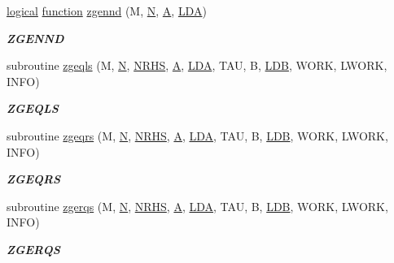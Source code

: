 \begin{DoxyCompactItemize}
\hyperlink{tnc_8c_aa7b64cdf39500931f7b333343791a104}{logical} \hyperlink{afunc_8m_a7b5e596df91eadea6c537c0825e894a7}{function} \hyperlink{group__complex16__lin_gadf56477aea9e1818a7c8d472f7fd1361}{zgennd} (M, \hyperlink{polmisc_8c_a0240ac851181b84ac374872dc5434ee4}{N}, \hyperlink{classA}{A}, \hyperlink{example__user_8c_ae946da542ce0db94dced19b2ecefd1aa}{L\+D\+A})
\begin{DoxyCompactList}\small\item\em {\bfseries Z\+G\+E\+N\+N\+D} \end{DoxyCompactList}\item 
subroutine \hyperlink{group__complex16__lin_ga0c294a42b3a456d8a3308f8618612ac8}{zgeqls} (M, \hyperlink{polmisc_8c_a0240ac851181b84ac374872dc5434ee4}{N}, \hyperlink{example__user_8c_aa0138da002ce2a90360df2f521eb3198}{N\+R\+H\+S}, \hyperlink{classA}{A}, \hyperlink{example__user_8c_ae946da542ce0db94dced19b2ecefd1aa}{L\+D\+A}, T\+A\+U, B, \hyperlink{example__user_8c_a50e90a7104df172b5a89a06c47fcca04}{L\+D\+B}, W\+O\+R\+K, L\+W\+O\+R\+K, I\+N\+F\+O)
\begin{DoxyCompactList}\small\item\em {\bfseries Z\+G\+E\+Q\+L\+S} \end{DoxyCompactList}\item 
subroutine \hyperlink{group__complex16__lin_gae16c0de73b5f5d10451d0823e0f40fc6}{zgeqrs} (M, \hyperlink{polmisc_8c_a0240ac851181b84ac374872dc5434ee4}{N}, \hyperlink{example__user_8c_aa0138da002ce2a90360df2f521eb3198}{N\+R\+H\+S}, \hyperlink{classA}{A}, \hyperlink{example__user_8c_ae946da542ce0db94dced19b2ecefd1aa}{L\+D\+A}, T\+A\+U, B, \hyperlink{example__user_8c_a50e90a7104df172b5a89a06c47fcca04}{L\+D\+B}, W\+O\+R\+K, L\+W\+O\+R\+K, I\+N\+F\+O)
\begin{DoxyCompactList}\small\item\em {\bfseries Z\+G\+E\+Q\+R\+S} \end{DoxyCompactList}\item 
subroutine \hyperlink{group__complex16__lin_ga389ba329fb6b7b36c0dfc00c310f8a24}{zgerqs} (M, \hyperlink{polmisc_8c_a0240ac851181b84ac374872dc5434ee4}{N}, \hyperlink{example__user_8c_aa0138da002ce2a90360df2f521eb3198}{N\+R\+H\+S}, \hyperlink{classA}{A}, \hyperlink{example__user_8c_ae946da542ce0db94dced19b2ecefd1aa}{L\+D\+A}, T\+A\+U, B, \hyperlink{example__user_8c_a50e90a7104df172b5a89a06c47fcca04}{L\+D\+B}, W\+O\+R\+K, L\+W\+O\+R\+K, I\+N\+F\+O)
\begin{DoxyCompactList}\small\item\em {\bfseries Z\+G\+E\+R\+Q\+S} \end{DoxyCompactList}\item 

\end{DoxyCompactItemize}
